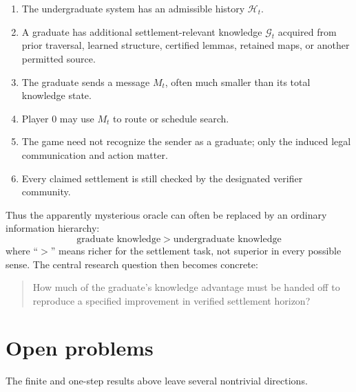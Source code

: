 \documentclass[11pt]{article}
\theoremstyle{definition}
\begin{document}
\begin{enumerate}[label=\arabic*.]
\item The undergraduate system has an admissible history $\mathscr H_t$.
\item A graduate has additional settlement-relevant knowledge $\mathscr G_t$ acquired from prior traversal, learned structure, certified lemmas, retained maps, or another permitted source.
\item The graduate sends a message $M_t$, often much smaller than its total knowledge state.
\item Player 0 may use $M_t$ to route or schedule search.
\item The game need not recognize the sender as a graduate; only the induced legal communication and action matter.
\item Every claimed settlement is still checked by the designated verifier community.
\end{enumerate}

Thus the apparently mysterious oracle can often be replaced by an ordinary information hierarchy:
\[
\boxed{
\text{graduate knowledge}
\;>\;
\text{undergraduate knowledge}
}
\]
where ``$>$'' means richer for the settlement task, not superior in every possible sense.  The central research question then becomes concrete:
\begin{quote}
How much of the graduate's knowledge advantage must be handed off to reproduce a specified improvement in verified settlement horizon?
\end{quote}

\section{Open problems}

The finite and one-step results above leave several nontrivial directions.
\end{document}

